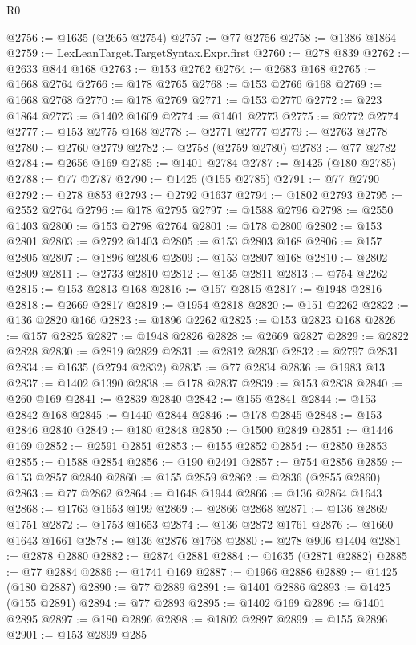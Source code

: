 \begin{lexlean}{R0}
\begin{coremodule}
@2756 := @1635 (@2665 @2754)
@2757 := @77 @2756
@2758 := @1386 @1864
@2759 := LexLeanTarget.TargetSyntax.Expr.first
@2760 := @278 @839
@2762 := @2633 @844 @168
@2763 := @153 @2762
@2764 := @2683 @168
@2765 := @1668 @2764
@2766 := @178 @2765
@2768 := @153 @2766 @168
@2769 := @1668 @2768
@2770 := @178 @2769
@2771 := @153 @2770
@2772 := @223 @1864
@2773 := @1402 @1609
@2774 := @1401 @2773
@2775 := @2772 @2774
@2777 := @153 @2775 @168
@2778 := @2771 @2777
@2779 := @2763 @2778
@2780 := @2760 @2779
@2782 := @2758 (@2759 @2780)
@2783 := @77 @2782
@2784 := @2656 @169
@2785 := @1401 @2784
@2787 := @1425 (@180 @2785)
@2788 := @77 @2787
@2790 := @1425 (@155 @2785)
@2791 := @77 @2790
@2792 := @278 @853
@2793 := @2792 @1637
@2794 := @1802 @2793
@2795 := @2552 @2764
@2796 := @178 @2795
@2797 := @1588 @2796
@2798 := @2550 @1403
@2800 := @153 @2798 @2764
@2801 := @178 @2800
@2802 := @153 @2801
@2803 := @2792 @1403
@2805 := @153 @2803 @168
@2806 := @157 @2805
@2807 := @1896 @2806
@2809 := @153 @2807 @168
@2810 := @2802 @2809
@2811 := @2733 @2810
@2812 := @135 @2811
@2813 := @754 @2262
@2815 := @153 @2813 @168
@2816 := @157 @2815
@2817 := @1948 @2816
@2818 := @2669 @2817
@2819 := @1954 @2818
@2820 := @151 @2262
@2822 := @136 @2820 @166
@2823 := @1896 @2262
@2825 := @153 @2823 @168
@2826 := @157 @2825
@2827 := @1948 @2826
@2828 := @2669 @2827
@2829 := @2822 @2828
@2830 := @2819 @2829
@2831 := @2812 @2830
@2832 := @2797 @2831
@2834 := @1635 (@2794 @2832)
@2835 := @77 @2834
@2836 := @1983 @13
@2837 := @1402 @1390
@2838 := @178 @2837
@2839 := @153 @2838
@2840 := @260 @169
@2841 := @2839 @2840
@2842 := @155 @2841
@2844 := @153 @2842 @168
@2845 := @1440 @2844
@2846 := @178 @2845
@2848 := @153 @2846 @2840
@2849 := @180 @2848
@2850 := @1500 @2849
@2851 := @1446 @169
@2852 := @2591 @2851
@2853 := @155 @2852
@2854 := @2850 @2853
@2855 := @1588 @2854
@2856 := @190 @2491
@2857 := @754 @2856
@2859 := @153 @2857 @2840
@2860 := @155 @2859
@2862 := @2836 (@2855 @2860)
@2863 := @77 @2862
@2864 := @1648 @1944
@2866 := @136 @2864 @1643
@2868 := @1763 @1653 @199
@2869 := @2866 @2868
@2871 := @136 @2869 @1751
@2872 := @1753 @1653
@2874 := @136 @2872 @1761
@2876 := @1660 @1643 @1661
@2878 := @136 @2876 @1768
@2880 := @278 @906 @1404
@2881 := @2878 @2880
@2882 := @2874 @2881
@2884 := @1635 (@2871 @2882)
@2885 := @77 @2884
@2886 := @1741 @169
@2887 := @1966 @2886
@2889 := @1425 (@180 @2887)
@2890 := @77 @2889
@2891 := @1401 @2886
@2893 := @1425 (@155 @2891)
@2894 := @77 @2893
@2895 := @1402 @169
@2896 := @1401 @2895
@2897 := @180 @2896
@2898 := @1802 @2897
@2899 := @155 @2896
@2901 := @153 @2899 @285

\end{coremodule}
\end{lexlean}
